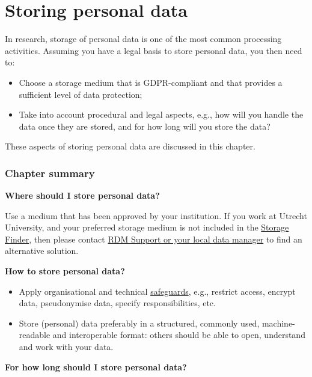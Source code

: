 \documentclass[
]{book}
\providecommand{\tightlist}{%
  \setlength{\itemsep}{0pt}\setlength{\parskip}{0pt}}
\begin{document}
\hypertarget{data-storage}{%
\chapter{Storing personal data}\label{data-storage}}

In research, storage of personal data is one of the most common processing
activities. Assuming you have a legal basis to store personal data, you
then need to:

\begin{itemize}
\tightlist
\item
  Choose a storage medium that is GDPR-compliant and that provides a sufficient
  level of data protection;
\item
  Take into account procedural and legal aspects, e.g., how will you handle the
  data once they are stored, and for how long will you store the data?
\end{itemize}

These aspects of storing personal data are discussed in this chapter.

\hypertarget{chapter-summary-1}{%
\subsection{Chapter summary}\label{chapter-summary-1}}

\textbf{Where should I store personal data?}

Use a medium that has been approved by your institution. If you work at Utrecht
University, and your preferred storage medium is not included in the
\href{https://tools.uu.nl/storagefinder/}{Storage Finder},
then please contact \protect\hyperlink{support}{RDM Support or your local data manager} to find
an alternative solution.

\textbf{How to store personal data?}

\begin{itemize}
\tightlist
\item
  Apply organisational and technical \protect\hyperlink{privacy-by-design}{safeguards},
  e.g., restrict access, encrypt data, pseudonymise data, specify responsibilities, etc.
\item
  Store (personal) data preferably in a structured, commonly used, machine-readable
  and interoperable format: others should be able to open, understand and work
  with your data.
\end{itemize}

\textbf{For how long should I store personal data?}
\end{document}

